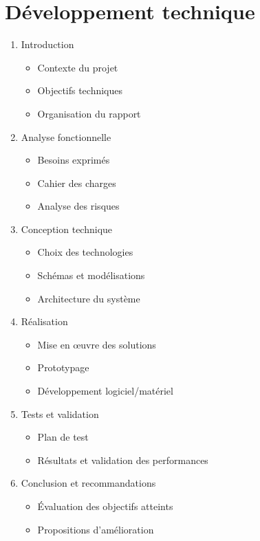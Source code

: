 \section{Développement technique}

\begin{enumerate}
    \item Introduction
          \begin{itemize}
              \item Contexte du projet
              \item Objectifs techniques
              \item Organisation du rapport
          \end{itemize}
    \item Analyse fonctionnelle
          \begin{itemize}
              \item Besoins exprimés
              \item Cahier des charges
              \item Analyse des risques
          \end{itemize}
    \item Conception technique
          \begin{itemize}
              \item Choix des technologies
              \item Schémas et modélisations
              \item Architecture du système
          \end{itemize}
    \item Réalisation
          \begin{itemize}
              \item Mise en œuvre des solutions
              \item Prototypage
              \item Développement logiciel/matériel
          \end{itemize}
    \item Tests et validation
          \begin{itemize}
              \item Plan de test
              \item Résultats et validation des performances
          \end{itemize}
    \item Conclusion et recommandations
          \begin{itemize}
              \item Évaluation des objectifs atteints
              \item Propositions d'amélioration
          \end{itemize}

\end{enumerate}